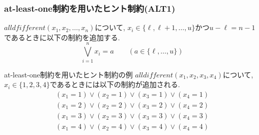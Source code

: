 \begin{frame}
    \frametitle{at-least-one制約を用いたヒント制約(ALT1)}
    \vspace{-3mm}
    \begin{block}{}
        $alldfifferent(x_1,x_2,\ldots,x_n)$について, $x_i \in \{\ell, \ell+1,\ldots, u\}$かつ$u-\ell=n-1$であるときに以下の制約を追加する.\\
        \vspace{-3mm}
        $$\bigvee_{i=1}^n x_i=a \qquad (a \in \{\ell,\ldots, u\})$$
    \end{block}
    \begin{exampleblock}{at-least-one制約を用いたヒント制約の例}
        $alldifferent(x_1, x_2, x_3, x_4)$について, $x_i \in \{1, 2, 3, 4\}$であるときには以下の制約が追加される.
        \vspace{-3mm}
        \begin{eqnarray*}
            (x_1=1) \lor (x_2=1) \lor (x_3=1) \lor (x_4=1)\\
            (x_1=2) \lor (x_2=2) \lor (x_3=2) \lor (x_4=2)\\
            (x_1=3) \lor (x_2=3) \lor (x_3=3) \lor (x_4=3)\\
            (x_1=4) \lor (x_2=4) \lor (x_3=4) \lor (x_4=4)
        \end{eqnarray*}
    \end{exampleblock}
\end{frame}


